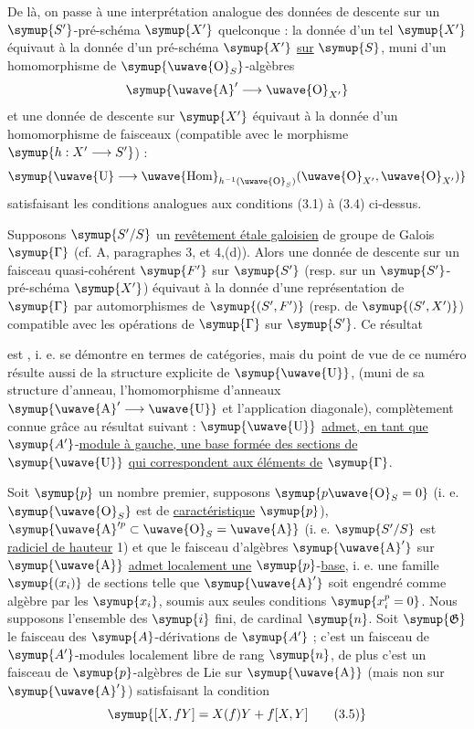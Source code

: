 De là, on passe à une interprétation analogue des données de descente sur un
$\symup{S'}$-pré-schéma $\symup{X'}$ quelconque : la donnée d'un tel $\symup{X'}$ équivaut à la donnée
d'un pré-schéma $\symup{X'}$ \uline{sur} $\symup{S}$, muni d'un homomorphisme de $\symup{\text{\uwave{O}}_S}$-algèbres
\[
  \symup{\text{\uwave{A}}'\longrightarrow\text{\uwave{O}}_{X'}}
\]
et une donnée de descente sur $\symup{X'}$ équivaut à la donnée d'un homomorphisme de
faisceaux (compatible avec le morphisme $\symup{h:X'\longrightarrow S'}$) :
\[
  \symup{\text{\uwave{U}}\longrightarrow
  \mathop{\text{\uwave{Hom}}}\nolimits_{h^{-1}(\text{\uwave{O}}_S)}
  (\text{\uwave{O}}_{X'},\text{\uwave{O}}_{X'})}
\]
satisfaisant les conditions analogues aux conditions (3.1) à (3.4) ci-dessus.

 Supposons $\symup{S'/S}$ un \uline{revêtement étale galoisien} de groupe de Galois $\symup{\Gamma}$ (cf. A, paragraphes 3, et 4,(d)). Alors une
donnée de descente sur un faisceau quasi-cohérent $\symup{F'}$ sur $\symup{S'}$ (resp. sur un
$\symup{S'}$-pré-schéma $\symup{X'}$) équivaut à la donnée d'une représentation de $\symup{\Gamma}$ par
automorphismes de $\symup{(S',F')}$ (resp. de $\symup{(S',X')}$) compatible avec les opérations
de $\symup{\Gamma}$ sur $\symup{S'}$. Ce résultat

est , i. e. se démontre en termes de catégories, mais du point de vue
de ce numéro résulte aussi de la structure explicite de $\symup{\text{\uwave{U}}}$, (muni de
sa structure d'anneau, l'homomorphisme d'anneaux
$\symup{\text{\uwave{A}}'\longrightarrow\text{\uwave{U}}}$ et l'application diagonale),
complètement connue grâce au résultat suivant : $\symup{\text{\uwave{U}}}$ \uline{admet, en tant que}
$\symup{A'}$-\uline{module à gauche, une base formée des sections de} $\symup{\text{\uwave{U}}}$ \uline{qui correspondent aux éléments de} $\symup{\Gamma}$.

 Soit $\symup{p}$ un nombre premier, supposons
$\symup{p\text{\uwave{O}}_S=0}$ (i. e. $\symup{\text{\uwave{O}}_S}$ est de \uline{caractéristique} $\symup{p}$),
$\symup{\text{\uwave{A}}'^p\subset\text{\uwave{O}}_S=\text{\uwave{A}}}$ (i. e. $\symup{S'/S}$ est \uline{radiciel de hauteur} 1) et que le faisceau d'algèbres $\symup{\text{\uwave{A}}'}$ sur $\symup{\text{\uwave{A}}}$ \uline{admet localement une} $\symup{p}$-\uline{base}, i. e. une famille $\symup{(x_i)}$ de sections telle que
$\symup{\text{\uwave{A}}'}$ soit engendré comme algèbre par les $\symup{x_i}$, soumis aux seules
conditions $\symup{x_i^p=0}$. Nous supposons l'ensemble des $\symup{i}$ fini, de cardinal $\symup{n}$.
Soit $\symup{\mathfrak G}$ le faisceau des $\symup{A}$-dérivations de $\symup{A'}$ ;
c'est un faisceau de $\symup{A'}$-modules localement libre de rang $\symup{n}$, de plus
c'est un faisceau de $\symup{p}$-algèbres de Lie sur $\symup{\text{\uwave{A}}}$ (mais non sur
$\symup{\text{\uwave{A}}'}$) satisfaisant la condition
\begin{equation}
  \symup{[X,fY]=X(f)Y+f[X,Y]
  \tag{3.5}}
\end{equation}

